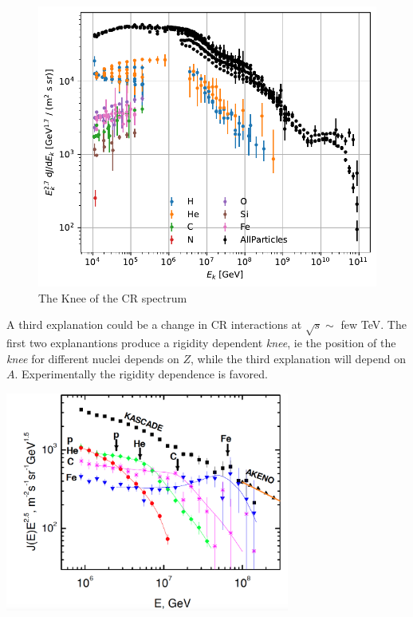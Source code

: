 \documentclass[
  letterpaper,
  DIV=11,
  numbers=noendperiod]{scrreprt}
\begin{document}
\begin{figure}[H]

{\centering \includegraphics{chap2_files/figure-pdf/cell-12-output-1.pdf}

}

\caption{The Knee of the CR spectrum}

\end{figure}%

A third explanation could be a change in CR interactions at
\({\sqrt s}\sim\) few TeV. The first two explanantions produce a
rigidity dependent \emph{knee}, ie the position of the \emph{knee} for
different nuclei depends on \(Z\), while the third explanation will
depend on \(A\). Experimentally the rigidity dependence is favored.

\begin{center}
\includegraphics[width=0.7\textwidth,height=\textheight]{images/knee.png}
\end{center}
\end{document}
